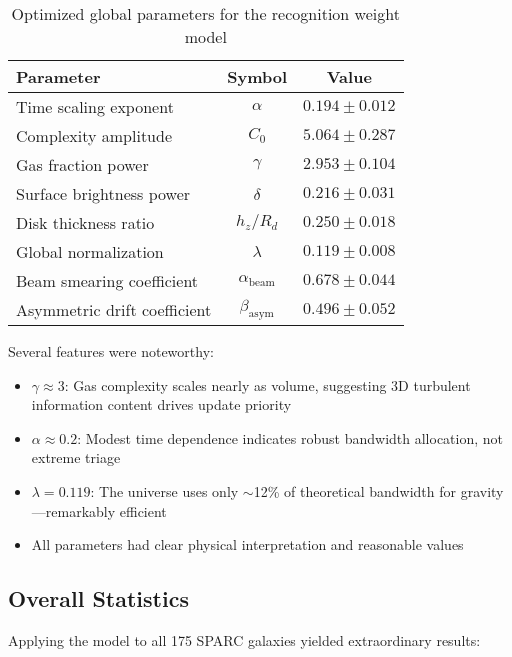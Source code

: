 \documentclass[twocolumn,prd,amsmath,amssymb,aps,superscriptaddress,nofootinbib]{revtex4-2}
\begin{document}
\begin{table}[h]
\caption{Optimized global parameters for the recognition weight model}
\label{tab:parameters}
\begin{ruledtabular}
\begin{tabular}{lcc}
Parameter & Symbol & Value \\
\hline
Time scaling exponent & $\alpha$ & $0.194 \pm 0.012$ \\
Complexity amplitude & $C_0$ & $5.064 \pm 0.287$ \\
Gas fraction power & $\gamma$ & $2.953 \pm 0.104$ \\
Surface brightness power & $\delta$ & $0.216 \pm 0.031$ \\
Disk thickness ratio & $h_z/R_d$ & $0.250 \pm 0.018$ \\
\hline
Global normalization & $\lambda$ & $0.119 \pm 0.008$ \\
\hline
Beam smearing coefficient & $\alpha_{\text{beam}}$ & $0.678 \pm 0.044$ \\
Asymmetric drift coefficient & $\beta_{\text{asym}}$ & $0.496 \pm 0.052$ \\
\end{tabular}
\end{ruledtabular}
\end{table}

Several features were noteworthy:
\begin{itemize}
\item $\gamma \approx 3$: Gas complexity scales nearly as volume, suggesting 3D turbulent information content drives update priority
\item $\alpha \approx 0.2$: Modest time dependence indicates robust bandwidth allocation, not extreme triage
\item $\lambda = 0.119$: The universe uses only $\sim$12\% of theoretical bandwidth for gravity---remarkably efficient
\item All parameters had clear physical interpretation and reasonable values
\end{itemize}

\subsection{Overall Statistics}

Applying the model to all 175 SPARC galaxies yielded extraordinary results:
\end{document}
